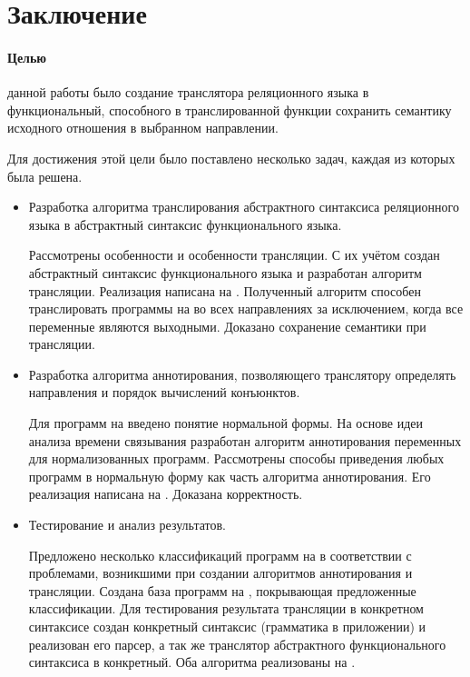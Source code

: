 \section*{Заключение}

\paragraph{Целью} данной работы было создание транслятора реляционного языка в функциональный, способного в транслированной функции сохранить семантику исходного отношения в выбранном направлении.

Для достижения этой цели было поставлено несколько задач, каждая из которых была решена.

\begin{itemize}
    \item Разработка алгоритма транслирования абстрактного синтаксиса реляционного языка в абстрактный синтаксис функционального языка.

    Рассмотрены особенности \miniKanren{} и особенности трансляции. С их учётом создан абстрактный синтаксис функционального языка и разработан алгоритм трансляции. Реализация написана на \haskell{}. Полученный алгоритм способен транслировать программы на \miniKanren{} во всех направлениях за исключением, когда все переменные являются выходными. Доказано сохранение семантики при трансляции.

    \item Разработка алгоритма аннотирования, позволяющего транслятору определять направления и порядок вычислений конъюнктов.
    
    Для программ на \miniKanren{} введено понятие нормальной формы. На основе идеи анализа времени связывания разработан алгоритм аннотирования переменных для нормализованных программ. Рассмотрены способы приведения любых программ в нормальную форму как часть алгоритма аннотирования. Его реализация написана на \haskell{}. Доказана корректность.

    \item Тестирование и анализ результатов.
    
    Предложено несколько классификаций программ на \miniKanren{} в соответствии с проблемами, возникшими при создании алгоритмов аннотирования и трансляции. Создана база программ на \miniKanren{}, покрывающая предложенные классификации. Для тестирования результата трансляции в конкретном синтаксисе создан конкретный синтаксис \miniKanren{} (грамматика в приложении) и реализован его парсер, а так же транслятор абстрактного функционального синтаксиса в конкретный. Оба алгоритма реализованы на \haskell{}.
    
\end{itemize}

